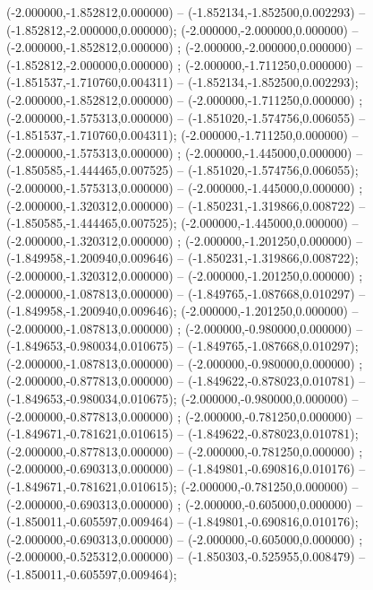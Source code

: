  (-2.000000,-1.852812,0.000000) -- (-1.852134,-1.852500,0.002293) -- (-1.852812,-2.000000,0.000000);
 (-2.000000,-2.000000,0.000000) -- (-2.000000,-1.852812,0.000000) ;
 (-2.000000,-2.000000,0.000000) -- (-1.852812,-2.000000,0.000000) ;
 (-2.000000,-1.711250,0.000000) -- (-1.851537,-1.710760,0.004311) -- (-1.852134,-1.852500,0.002293);
 (-2.000000,-1.852812,0.000000) -- (-2.000000,-1.711250,0.000000) ;
 (-2.000000,-1.575313,0.000000) -- (-1.851020,-1.574756,0.006055) -- (-1.851537,-1.710760,0.004311);
 (-2.000000,-1.711250,0.000000) -- (-2.000000,-1.575313,0.000000) ;
 (-2.000000,-1.445000,0.000000) -- (-1.850585,-1.444465,0.007525) -- (-1.851020,-1.574756,0.006055);
 (-2.000000,-1.575313,0.000000) -- (-2.000000,-1.445000,0.000000) ;
 (-2.000000,-1.320312,0.000000) -- (-1.850231,-1.319866,0.008722) -- (-1.850585,-1.444465,0.007525);
 (-2.000000,-1.445000,0.000000) -- (-2.000000,-1.320312,0.000000) ;
 (-2.000000,-1.201250,0.000000) -- (-1.849958,-1.200940,0.009646) -- (-1.850231,-1.319866,0.008722);
 (-2.000000,-1.320312,0.000000) -- (-2.000000,-1.201250,0.000000) ;
 (-2.000000,-1.087813,0.000000) -- (-1.849765,-1.087668,0.010297) -- (-1.849958,-1.200940,0.009646);
 (-2.000000,-1.201250,0.000000) -- (-2.000000,-1.087813,0.000000) ;
 (-2.000000,-0.980000,0.000000) -- (-1.849653,-0.980034,0.010675) -- (-1.849765,-1.087668,0.010297);
 (-2.000000,-1.087813,0.000000) -- (-2.000000,-0.980000,0.000000) ;
 (-2.000000,-0.877813,0.000000) -- (-1.849622,-0.878023,0.010781) -- (-1.849653,-0.980034,0.010675);
 (-2.000000,-0.980000,0.000000) -- (-2.000000,-0.877813,0.000000) ;
 (-2.000000,-0.781250,0.000000) -- (-1.849671,-0.781621,0.010615) -- (-1.849622,-0.878023,0.010781);
 (-2.000000,-0.877813,0.000000) -- (-2.000000,-0.781250,0.000000) ;
 (-2.000000,-0.690313,0.000000) -- (-1.849801,-0.690816,0.010176) -- (-1.849671,-0.781621,0.010615);
 (-2.000000,-0.781250,0.000000) -- (-2.000000,-0.690313,0.000000) ;
 (-2.000000,-0.605000,0.000000) -- (-1.850011,-0.605597,0.009464) -- (-1.849801,-0.690816,0.010176);
 (-2.000000,-0.690313,0.000000) -- (-2.000000,-0.605000,0.000000) ;
 (-2.000000,-0.525312,0.000000) -- (-1.850303,-0.525955,0.008479) -- (-1.850011,-0.605597,0.009464);
